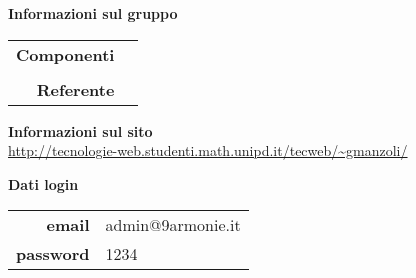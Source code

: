 \begin{center}
\textbf{Informazioni sul gruppo} \\ \vspace{0.5em}
\small
\begin{tabular}{r|l}
	\textbf{Componenti}    & \editorialstaff \\
	 & \\ 
	\textbf{Referente} &  \\
\end{tabular}
\end{center}

\vspace{3em}

\begin{center}
\textbf{Informazioni sul sito} \\ 
\vspace{0.5em}
 \small \url{http://tecnologie-web.studenti.math.unipd.it/tecweb/~gmanzoli/} \\
\end{center}

\begin{center}
\textbf{Dati login} \\ \vspace{0.5em}
\small
\begin{tabular}{r|l}
	\textbf{email} & admin@9armonie.it \\
	\textbf{password} & 1234\\
\end{tabular}
\end{center}

\normalsize